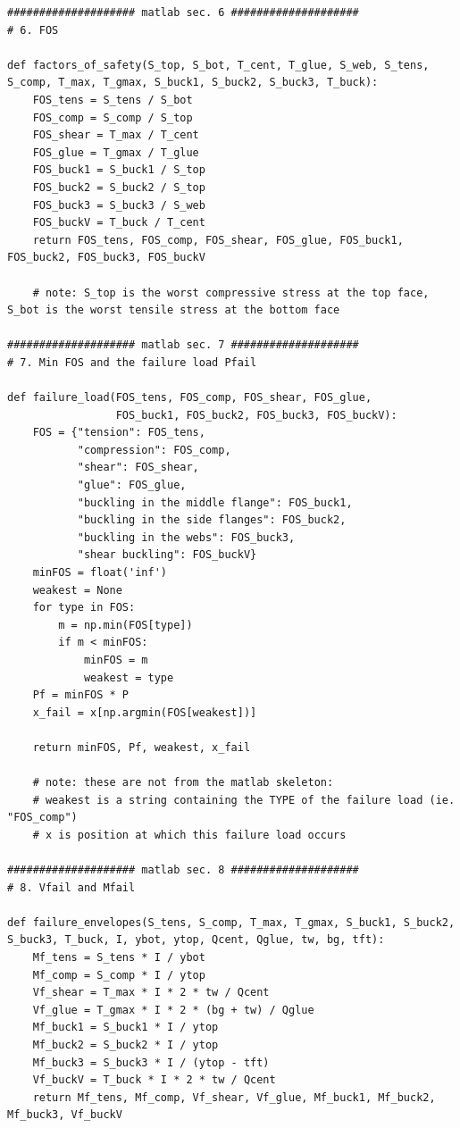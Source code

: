 \begin{verbatim}
#################### matlab sec. 6 ####################
# 6. FOS

def factors_of_safety(S_top, S_bot, T_cent, T_glue, S_web, S_tens, S_comp, T_max, T_gmax, S_buck1, S_buck2, S_buck3, T_buck):
    FOS_tens = S_tens / S_bot
    FOS_comp = S_comp / S_top
    FOS_shear = T_max / T_cent
    FOS_glue = T_gmax / T_glue
    FOS_buck1 = S_buck1 / S_top
    FOS_buck2 = S_buck2 / S_top
    FOS_buck3 = S_buck3 / S_web
    FOS_buckV = T_buck / T_cent
    return FOS_tens, FOS_comp, FOS_shear, FOS_glue, FOS_buck1, FOS_buck2, FOS_buck3, FOS_buckV

    # note: S_top is the worst compressive stress at the top face, S_bot is the worst tensile stress at the bottom face

#################### matlab sec. 7 ####################
# 7. Min FOS and the failure load Pfail

def failure_load(FOS_tens, FOS_comp, FOS_shear, FOS_glue,
                 FOS_buck1, FOS_buck2, FOS_buck3, FOS_buckV):
    FOS = {"tension": FOS_tens,
           "compression": FOS_comp,
           "shear": FOS_shear,
           "glue": FOS_glue,
           "buckling in the middle flange": FOS_buck1,
           "buckling in the side flanges": FOS_buck2,
           "buckling in the webs": FOS_buck3,
           "shear buckling": FOS_buckV}
    minFOS = float('inf')
    weakest = None
    for type in FOS:
        m = np.min(FOS[type])
        if m < minFOS:
            minFOS = m
            weakest = type
    Pf = minFOS * P
    x_fail = x[np.argmin(FOS[weakest])]
    
    return minFOS, Pf, weakest, x_fail

    # note: these are not from the matlab skeleton:
    # weakest is a string containing the TYPE of the failure load (ie. "FOS_comp")
    # x is position at which this failure load occurs

#################### matlab sec. 8 ####################
# 8. Vfail and Mfail

def failure_envelopes(S_tens, S_comp, T_max, T_gmax, S_buck1, S_buck2, S_buck3, T_buck, I, ybot, ytop, Qcent, Qglue, tw, bg, tft):
    Mf_tens = S_tens * I / ybot
    Mf_comp = S_comp * I / ytop
    Vf_shear = T_max * I * 2 * tw / Qcent
    Vf_glue = T_gmax * I * 2 * (bg + tw) / Qglue
    Mf_buck1 = S_buck1 * I / ytop
    Mf_buck2 = S_buck2 * I / ytop
    Mf_buck3 = S_buck3 * I / (ytop - tft)
    Vf_buckV = T_buck * I * 2 * tw / Qcent
    return Mf_tens, Mf_comp, Vf_shear, Vf_glue, Mf_buck1, Mf_buck2, Mf_buck3, Vf_buckV


\end{verbatim}
